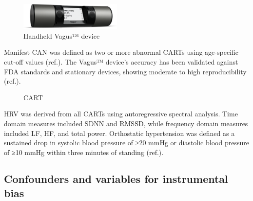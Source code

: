 \documentclass[
  a4paper,
  headsepline=true,
  open=any]{scrbook}
\begin{document}
\begin{figure}

{\centering \includegraphics[width=2in,height=\textheight]{images/vagus_device.png}

}

\caption{Handheld Vagus™ device}

\end{figure}

Manifest CAN was defined as two or more abnormal CARTs using
age-specific cut-off values (ref.). The Vagus™ device's accuracy has
been validated against FDA standards and stationary devices, showing
moderate to high reproducibility (ref.).

\begin{figure}

\begin{minipage}[t]{\linewidth}

{\centering 


\caption{CART}

}

\end{minipage}%

\end{figure}

HRV was derived from all CARTs using autoregressive spectral analysis.
Time domain measures included SDNN and RMSSD, while frequency domain
measures included LF, HF, and total power. Orthostatic hypertension was
defined as a sustained drop in systolic blood pressure of ≥20 mmHg or
diastolic blood pressure of ≥10 mmHg within three minutes of standing
(ref.).

\hypertarget{confounders-and-variables-for-instrumental-bias}{%
\subsection{Confounders and variables for instrumental
bias}\label{confounders-and-variables-for-instrumental-bias}}
\end{document}
